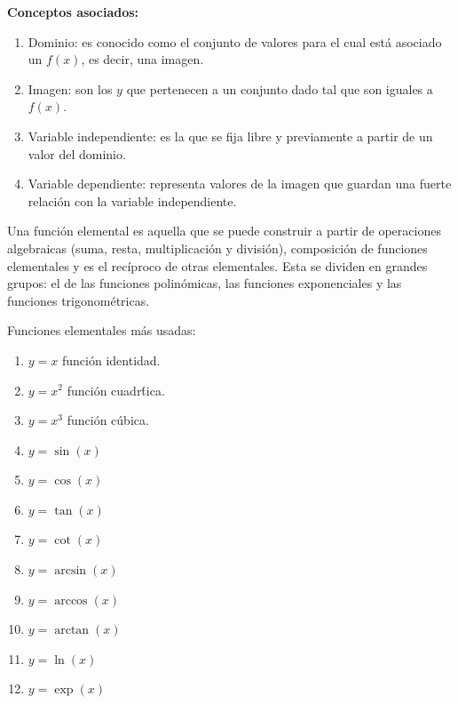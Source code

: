 \documentclass[10pt,twoside]{SelfArx} %
\begin{document}
\textbf{Conceptos asociados:}\\
\begin{enumerate}
	\item \textsf{Dominio}: es conocido como el conjunto de valores para el cual está asociado un $ f(x) $, es decir, una imagen.
	\item \textsf{Imagen}: son los $ y $ que pertenecen a un conjunto dado tal que son iguales a $ f(x) $.
	\item \textsf{Variable independiente}: es la que se fija libre y previamente a partir  de un valor del dominio.
	\item \textsf{Variable dependiente}: representa valores de la imagen que guardan una fuerte relaci\'on con la variable independiente.
\end{enumerate}

	
\begin{thm}
	Una \textsf{función elemental }es aquella que se puede construir a partir de operaciones algebraicas (suma, resta, multiplicación y división), composición de funciones elementales y es el recíproco de otras elementales. Esta se dividen en grandes grupos: el de las funciones polinómicas, las funciones exponenciales y las funciones trigonométricas.\\
		
\end{thm}
Funciones elementales más usadas:\\
\begin{enumerate}
	\item$ y=x $ funci\'on identidad.
	\item$ y=x^{2} $ funci\'on cuadr\'tica.
	\item$ y=x^{3} $ funci\'on c\'ubica.
	\item$ y=\sin(x) $
	\item$ y=\cos(x) $
	\item$ y=\tan(x) $
	\item$ y=\cot(x) $
	\item$ y=\arcsin(x) $
	\item$ y=\arccos(x) $
	\item$ y=\arctan(x) $
	\item$ y=\ln(x) $
	\item$ y=\exp(x) $

\end{enumerate}
\end{document}
